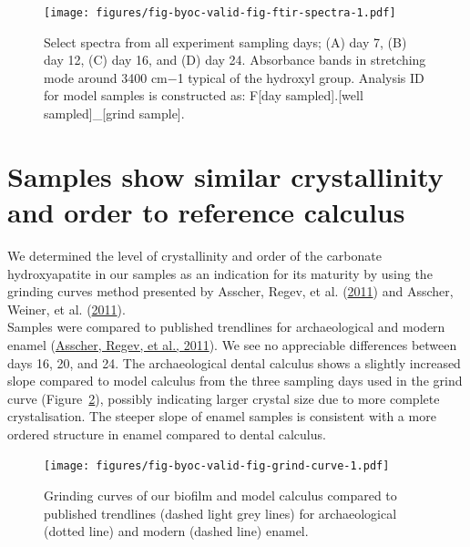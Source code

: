 \documentclass[
  letterpaper,
]{book}
\begin{document}
\begin{figure}

{\centering \texttt{[image: figures/fig-byoc-valid-fig-ftir-spectra-1.pdf]}

}

\caption{\label{fig-ftir-spectra}Select spectra from all experiment
sampling days; (A) day 7, (B) day 12, (C) day 16, and (D) day 24.
Absorbance bands in stretching mode around 3400 cm−1 typical of the
hydroxyl group. Analysis ID for model samples is constructed as: F{[}day
sampled{]}.{[}well sampled{]}\_{[}grind sample{]}.}

\end{figure}

\hypertarget{samples-show-similar-crystallinity-and-order-to-reference-calculus}{%
\section{Samples show similar crystallinity and order to reference
calculus}\label{samples-show-similar-crystallinity-and-order-to-reference-calculus}}

We determined the level of crystallinity and order of the carbonate
hydroxyapatite in our samples as an indication for its maturity by using
the grinding curves method presented by Asscher, Regev, et al.
(\protect\hyperlink{ref-asscherAtomicDisorder2011}{2011}) and Asscher,
Weiner, et al.
(\protect\hyperlink{ref-asscherVariationsAtomic2011}{2011}).\\
Samples were compared to published trendlines for archaeological and
modern enamel
(\protect\hyperlink{ref-asscherAtomicDisorder2011}{Asscher, Regev, et
al., 2011}). We see no appreciable differences between days 16, 20, and
24. The archaeological dental calculus shows a slightly increased slope
compared to model calculus from the three sampling days used in the
grind curve (Figure~\ref{fig-grind-curve}), possibly indicating larger
crystal size due to more complete crystalisation. The steeper slope of
enamel samples is consistent with a more ordered structure in enamel
compared to dental calculus.

\begin{figure}

{\centering \texttt{[image: figures/fig-byoc-valid-fig-grind-curve-1.pdf]}

}

\caption{\label{fig-grind-curve}Grinding curves of our biofilm and model
calculus compared to published trendlines (dashed light grey lines) for
archaeological (dotted line) and modern (dashed line) enamel.}

\end{figure}
\end{document}
